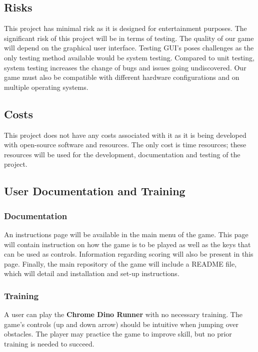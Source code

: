 \documentclass[12pt]{article}
\begin{document}
\subsection{Risks}
This project has minimal risk as it is designed for entertainment purposes. The significant risk of this project will be in terms of testing. The quality of our game will depend on the graphical user interface. Testing GUI’s poses challenges as the only testing method available would be system testing. Compared to unit testing, system testing increases the change of bugs and issues going undiscovered. Our game must also be compatible with different hardware configurations and on multiple operating systems.
\subsection{Costs}
This project does not have any costs associated with it as it is being developed with open-source software and resources. The only cost is time resources; these resources will be used for the development, documentation and testing of the project. 
\subsection{User Documentation and Training}
\subsubsection{Documentation}
An instructions page will be available in the main menu of the game.
This page will contain instruction on how the game is to be played as well as the keys that can be used as controls. Information regarding scoring will also be present in this page.
Finally, the main repository of the game will include a README file, which will detail and installation and set-up instructions.
\subsubsection{Training}
A user can play the \textbf{Chrome Dino Runner} with no necessary training. The game's controls (up and down arrow) should be intuitive when jumping over obstacles. The player may practice the game to improve skill, but no prior training is needed to succeed.  
\end{document}

